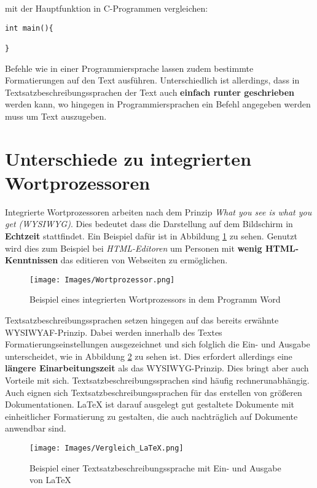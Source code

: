 mit der Hauptfunktion in C-Programmen vergleichen:

\begin{lstlisting}
int main(){

} 
\end{lstlisting}
Befehle wie in einer Programmiersprache lassen zudem bestimmte Formatierungen auf den Text ausführen.
Unterschiedlich ist allerdings, dass in Textsatzbeschreibungssprachen der Text auch \textbf{einfach runter geschrieben} werden kann, wo hingegen in Programmiersprachen ein Befehl angegeben werden muss um Text auszugeben.

\section{Unterschiede zu integrierten Wortprozessoren}
Integrierte Wortprozessoren arbeiten nach dem Prinzip \textit{What you see is what you get (WYSIWYG)}\cite{wysiwyg:2023}.
Dies bedeutet dass die Darstellung auf dem Bildschirm in \textbf{Echtzeit} stattfindet.
Ein Beispiel dafür ist in Abbildung \ref{Wortprozessor} zu sehen.
Genutzt wird dies zum Beispiel bei \textit{HTML-Editoren} um Personen mit \textbf{wenig HTML-Kenntnissen} das editieren von Webseiten zu ermöglichen.

\begin{figure}[h]
	\centering
	\texttt{[image: Images/Wortprozessor.png]}
	\caption{Beispiel eines integrierten Wortprozessors in dem Programm Word}
	\label{Wortprozessor}
\end{figure}

Textsatzbeschreibungssprachen setzen hingegen auf das bereits erwähnte WYSIWYAF-Prinzip.
Dabei werden innerhalb des Textes Formatierungseinstellungen ausgezeichnet und sich folglich die Ein- und Ausgabe unterscheidet, wie in Abbildung \ref{VergleichLaTeX} zu sehen ist.
Dies erfordert allerdings eine \textbf{längere Einarbeitungszeit} als das WYSIWYG-Prinzip.
Dies bringt aber auch Vorteile mit sich.
Textsatzbeschreibungssprachen sind häufig rechnerunabhängig.
Auch eignen sich Textsatzbeschreibungssprachen für das erstellen von größeren Dokumentationen.
LaTeX ist darauf ausgelegt gut gestaltete Dokumente mit einheitlicher Formatierung zu gestalten, die auch nachträglich auf Dokumente anwendbar sind\cite{schweitze:2013}.\par 

\begin{figure}[h]
	\centering
	\texttt{[image: Images/Vergleich\_LaTeX.png]}
	\caption{Beispiel einer Textsatzbeschreibungssprache mit Ein- und Ausgabe von LaTeX}
	\label{VergleichLaTeX}
\end{figure}

